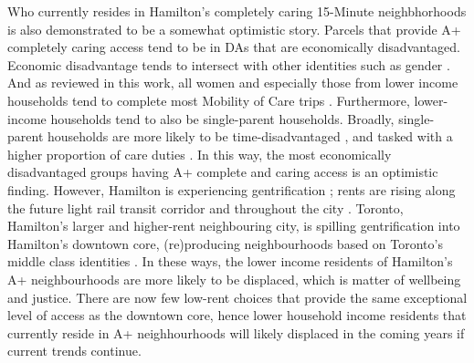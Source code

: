 \documentclass[
  authoryear,
  preprint,
  3p]{elsarticle}
\begin{document}
Who currently resides in Hamilton's completely caring 15-Minute
neighbhorhoods is also demonstrated to be a somewhat optimistic story.
Parcels that provide A+ completely caring access tend to be in DAs that
are economically disadvantaged. Economic disadvantage tends to intersect
with other identities such as gender
\citep{lightmanMeasuringEconomicExclusion2018}. And as reviewed in this
work, all women and especially those from lower income households tend
to complete most Mobility of Care trips
\citep{ravensbergen2023exploratory}. Furthermore, lower-income
households tend to also be single-parent households. Broadly,
single-parent households are more likely to be time-disadvantaged
\citep{nieuwenhuisSingleparentFamiliesWork2018}, and tasked with a
higher proportion of care duties \citep{craigTimeCareComparison2004}. In
this way, the most economically disadvantaged groups having A+ complete
and caring access is an optimistic finding. However, Hamilton is
experiencing gentrification \citep{ellisyoungWeReJust2018}; rents are
rising along the future light rail transit corridor and throughout the
city
\citep{vandermerweSpilloverGentrificationMidsized2021, mayersLightTransitDocumenting2023}.
Toronto, Hamilton's larger and higher-rent neighbouring city, is
spilling gentrification into Hamilton's downtown core, (re)producing
neighbourhoods based on Toronto's middle class identities
\citep{mayersLightTransitDocumenting2023}. In these ways, the lower
income residents of Hamilton's A+ neighbourhoods are more likely to be
displaced, which is matter of wellbeing and justice. There are now few
low-rent choices that provide the same exceptional level of access as
the downtown core, hence lower household income residents that currently
reside in A+ neighhourhoods will likely displaced in the coming years if
current trends continue.
\end{document}
